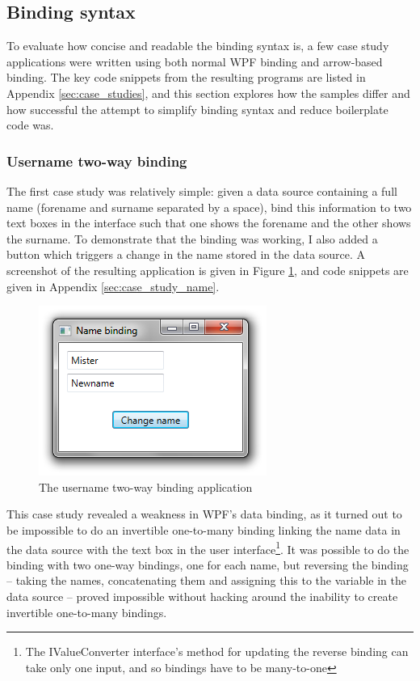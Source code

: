 \documentclass[12pt,twoside,notitlepage]{report}
\begin{document}
\subsection{Binding syntax}

To evaluate how concise and readable the binding syntax is, a few case study applications were written using both normal WPF binding and arrow-based binding. The key code snippets from the resulting programs are listed in Appendix \ref{sec:case_studies}, and this section explores how the samples differ and how successful the attempt to simplify binding syntax and reduce boilerplate code was.

\subsubsection{Username two-way binding}

The first case study was relatively simple: given a data source containing a full name (forename and surname separated by a space), bind this information to two text boxes in the interface such that one shows the forename and the other shows the surname. To demonstrate that the binding was working, I also added a button which triggers a change in the name stored in the data source. A screenshot of the resulting application is given in Figure \ref{fig:case_study_name}, and code snippets are given in Appendix \ref{sec:case_study_name}.

\begin{figure}[!ht]
  \centering
  \includegraphics{fig/CaseStudyNameBinding.png}
  \caption{The username two-way binding application}
  \label{fig:case_study_name}
\end{figure}

This case study revealed a weakness in WPF's data binding, as it turned out to be impossible to do an invertible one-to-many binding linking the name data in the data source with the text box in the user interface\footnote{The IValueConverter interface's method for updating the reverse binding can take only one input, and so bindings have to be many-to-one}. It was possible to do the binding with two one-way bindings, one for each name, but reversing the binding -- taking the names, concatenating them and assigning this to the variable in the data source -- proved impossible without hacking around the inability to create invertible one-to-many bindings.
\end{document}
